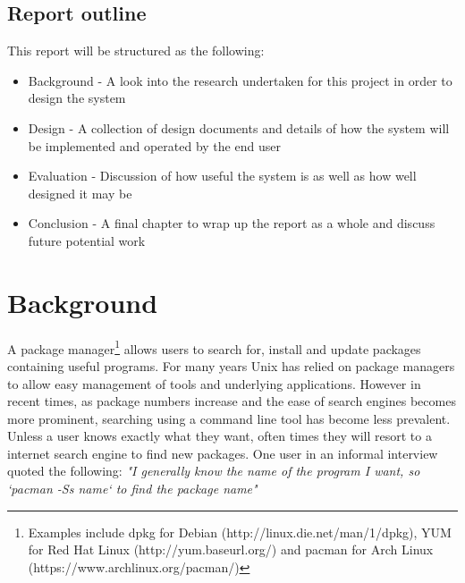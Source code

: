 \documentclass{l4proj}
\begin{document}
\section{Report outline}
This report will be structured as the following:
\begin{itemize}
\item Background - A look into the research undertaken for this project in order to design the system
\item Design - A collection of design documents and details of how the system will be implemented and operated by the end user
\item Evaluation - Discussion of how useful the system is as well as how well designed it may be
\item Conclusion - A final chapter to wrap up the report as a whole and discuss future potential work
\end{itemize}
 
 
\chapter{Background}
A package manager\footnote{Examples include dpkg for Debian (http://linux.die.net/man/1/dpkg), YUM for Red Hat Linux (http://yum.baseurl.org/) and pacman for Arch Linux (https://www.archlinux.org/pacman/)} allows users to search for, install and update packages containing useful programs. For many years Unix has relied on package managers to allow easy management of tools and underlying applications. However in recent times, as package numbers increase and the ease of search engines becomes more prominent, searching using a command line tool has become less prevalent. Unless a user knows exactly what they want, often times they will resort to a internet search engine to find new packages. One user in an informal interview quoted the following: \emph{"I generally know the name of the program I want, so `pacman -Ss name` to find the package name"}
\end{document}

